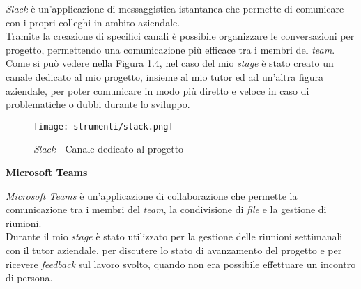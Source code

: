 \noindent \textit{Slack} è un'applicazione di messaggistica istantanea che permette di comunicare con i propri colleghi in ambito aziendale. \\
Tramite la creazione di specifici canali è possibile organizzare le conversazioni per progetto, permettendo una comunicazione più efficace tra i membri del \textit{team}.\\
Come si può vedere nella {\hyperref[fig:slack]{Figura 1.4}}, nel caso del mio \textit{stage} è stato creato un canale dedicato al mio progetto, insieme al mio tutor ed ad un'altra figura aziendale, per poter comunicare in modo più diretto e veloce 
in caso di problematiche o dubbi durante lo sviluppo.

\begin{figure}[H]
    \label{fig:slack} 
    \centering
    \texttt{[image: strumenti/slack.png]}
    \caption{\textit{Slack} - Canale dedicato al progetto}
\end{figure}

\noindent \textbf{Microsoft Teams\\}

\noindent \textit{Microsoft Teams} è un'applicazione di collaborazione che permette la comunicazione tra i membri del \textit{team}, la condivisione di \textit{file} e la gestione di riunioni.\\
Durante il mio \textit{stage} è stato utilizzato per la gestione delle riunioni settimanali con il tutor aziendale, per discutere lo stato di avanzamento del progetto e per ricevere \textit{feedback} sul lavoro svolto, quando
non era possibile effettuare un incontro di persona.
